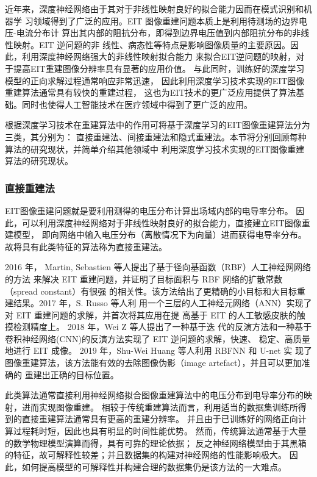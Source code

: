 
近年来，深度神经网络由于其对于非线性映射良好的拟合能力因而在模式识别和机器学
习领域得到了广泛的应用。EIT 图像重建问题本质上是利用待测场的边界电压-电流分布计
算出其内部的阻抗分布，即得到边界电压值到内部阻抗分布的非线性映射。EIT 逆问题的非
线性、病态性等特点是影响图像质量的主要原因。因此，利用深度神经网络强大的非线性映射拟合能力
来拟合EIT逆问题的映射，对于提高EIT重建图像分辨率具有显著的应用价值。
与此同时，训练好的深度学习模型的正向求解过程通常响应非常迅速，
因此利用深度学习技术实现的EIT图像重建算法通常具有较快的重建过程，
这也为EIT技术的更广泛应用提供了算法基础。同时也使得人工智能技术在医疗领域中得到了更广泛的应用。 

根据深度学习技术在重建算法中的作用可将基于深度学习的EIT图像重建算法分为三类，其分别为：
直接重建法、间接重建法和隐式重建法。本节将分别回顾每种算法的研究现状，并简单介绍其他领域中
利用深度学习技术实现的EIT图像重建算法的研究现状。

\subsubsection{直接重建法}

EIT图像重建问题就是要利用测得的电压分布计算出场域内部的电导率分布。
因此，可以利用深度神经网络对于非线性映射良好的拟合能力，直接建立EIT图像重建模型，
即向网络中输入电压分布（离散情况下为向量）进而获得电导率分布。
故将具有此类特征的算法称为直接重建法。

2016 年， Martin, Sebastien 等人提出了基于径向基函数（RBF）人工神经网网络的方法
来解决 EIT 重建问题，并证明了目标面积与 RBF 网络的扩散常数（spread constant）有很强
的相关性。该方法给出了更精确的小目标和大目标重建结果\cite{Ontheinf}。2017 年，S. Russo 等人利
用一个三层的人工神经元网络（ANN）实现了对 EIT 重建问题的求解，并首次将其应用在提
高基于 EIT 的人工敏感皮肤的触摸检测精度上。\cite{8233910} 2018 年，Wei Z 等人提出了一种基于迭
代的反演方法和一种基于卷积神经网络(CNN)的反演方法实现了 EIT 逆问题的求解，快速、
稳定、高质量地进行 EIT 成像。\cite{8606211} 2019 年，Shu-Wei Huang 等人利用 RBFNN 和 U-net 实
现了图像重建算法，该方法能有效的去除图像伪影（image artefact），并且可以更加准确的
重建出正确的目标位置\cite{8856781}。

此类算法通常直接利用神经网络拟合图像重建算法中的电压分布到电导率分布的映射，进而实现图像重建。
相较于传统重建算法而言，利用适当的数据集训练所得到的直接重建算法通常具有更高的重建分辨率。
并且由于已训练好的网络正向计算过程耗时短，因此也具有明显的时间性能优势。
然而，传统算法通常基于大量的数学物理模型演算而得，具有可靠的理论依据；
反之神经网络模型由于其黑箱的特征，故可解释性较差；并且数据集的构建对神经网络的性能影响极大。
因此，如何提高模型的可解释性并构建合理的数据集仍是该方法的一大难点。 

